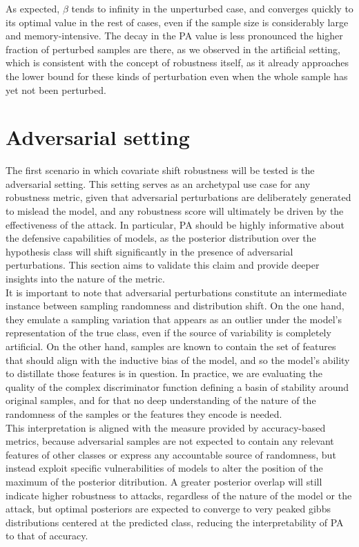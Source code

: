 As expected, $\beta$ tends to infinity in the unperturbed case, and converges
quickly to its optimal value in the rest of cases, even if the sample size is considerably
large and memory-intensive. The decay in the PA value is less pronounced the higher
fraction of perturbed samples are there, as we observed in the artificial setting, which
is consistent with the concept of robustness itself, as it already approaches
the lower bound for these kinds of perturbation even when the whole sample has yet not
been perturbed. \\

\section{Adversarial setting}\label{sec:results_adversarial}

The first scenario in which covariate shift robustness will be tested is the
adversarial setting. This setting serves as an archetypal use case for any robustness 
metric, given that adversarial perturbations are deliberately generated to mislead the
model, and any robustness score will ultimately be driven by the effectiveness of the 
attack. In particular, PA should be highly informative about the defensive capabilities 
of models, as the posterior distribution over the hypothesis class will shift 
significantly in the presence of adversarial perturbations. This section aims to validate 
this claim and provide deeper insights into the nature of the metric. \\

It is important to note that adversarial perturbations constitute an
intermediate instance between sampling randomness and distribution shift. 
On the one hand, they emulate a sampling variation that appears 
as an outlier under the model's representation of the true class, even if
the source of variability is completely artificial. On the other
hand, samples are known to contain the set of features that should 
align with the inductive bias of the model, and so the model's ability to 
distillate those features is in question. In practice, we are evaluating the 
quality of the complex discriminator function defining a basin of stability
around original samples, and for that no deep understanding of the nature of 
the randomness of the samples or the features they encode is needed.\\

This interpretation is aligned with the measure provided by accuracy-based metrics, 
because adversarial samples are not expected to contain any relevant features of other
classes or express any accountable source of randomness, but instead exploit specific
vulnerabilities of models to alter the position of the maximum of 
the posterior ditribution. A greater posterior overlap will still
indicate higher robustness to attacks, regardless of the nature of the model or the
attack, but optimal posteriors are expected to converge to very peaked gibbs
distributions centered at the predicted class, reducing the interpretability of PA
to that of accuracy. \\

